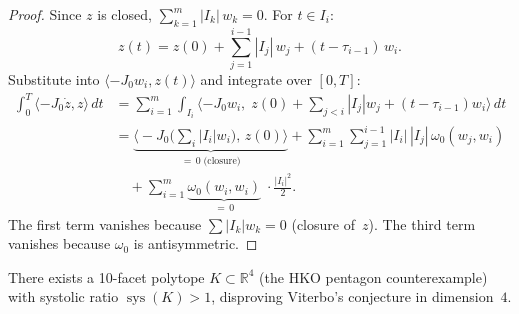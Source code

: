 \begin{proof}
Since $z$ is closed, $\sum_{k=1}^m |I_k|\, w_k = 0$.
For $t \in I_i$:
\[
  z(t) = z(0) + \sum_{j=1}^{i-1} |I_j|\, w_j
    + (t - \tau_{i-1})\, w_i.
\]
Substitute into
$\langle -J_0 w_i, z(t) \rangle$ and integrate over $[0, T]$:
\begin{align*}
\int_0^T \!\langle{-}J_0 \dot{z}, z \rangle \, dt
  &= \sum_{i=1}^m \int_{I_i}
    \!\langle -J_0 w_i,\;
      z(0) + \textstyle\sum_{j < i} |I_j| w_j
      + (t{-}\tau_{i-1}) w_i
    \rangle\, dt \\
  &= \underbrace{
      \bigl\langle -J_0 \bigl(\textstyle\sum_i |I_i| w_i\bigr),\,
      z(0) \bigr\rangle
    }_{= \, 0 \;\text{(closure)}}
  + \sum_{i=1}^m \sum_{j=1}^{i-1}
      |I_i|\, |I_j|\, \omega_0(w_j, w_i) \\
  &\quad
  + \sum_{i=1}^m
      \underbrace{\omega_0(w_i, w_i)}_{= \, 0}\;
      \cdot \tfrac{|I_i|^2}{2}.
\end{align*}
The first term vanishes because
$\sum |I_k| w_k = 0$ (closure of~$z$).
The third term vanishes because
$\omega_0$ is antisymmetric.
\end{proof}



\begin{unverified}
\begin{theorem}%
\label{thm:hko-counterexample}
There exists a 10-facet polytope $K \subset \mathbb{R}^4$
(the HKO pentagon counterexample) with systolic ratio
$\operatorname{sys}(K) > 1$, disproving Viterbo's conjecture
in dimension~$4$.
\end{theorem}
\end{unverified}

